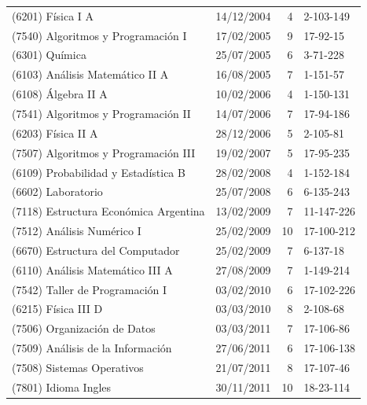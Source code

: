 \documentclass[a4paper,11pt]{article}
\begin{document}
\begin{longtable}{|l|l|r|l|}
  (6201) Física I A                                 & 14/12/2004 & 4  & 2-103-149         \\
  (7540) Algoritmos y Programación I                & 17/02/2005 & 9  & 17-92-15          \\
  (6301) Química                                    & 25/07/2005 & 6  & 3-71-228          \\
  (6103) Análisis Matemático II A                   & 16/08/2005 & 7  & 1-151-57          \\
  (6108) Álgebra II A                               & 10/02/2006 & 4  & 1-150-131         \\
  (7541) Algoritmos y Programación II               & 14/07/2006 & 7  & 17-94-186         \\
  (6203) Física II A                                & 28/12/2006 & 5  & 2-105-81          \\
  (7507) Algoritmos y Programación III              & 19/02/2007 & 5  & 17-95-235         \\
  (6109) Probabilidad y Estadística B               & 28/02/2008 & 4  & 1-152-184         \\
  (6602) Laboratorio                                & 25/07/2008 & 6  & 6-135-243         \\
  (7118) Estructura Económica Argentina             & 13/02/2009 & 7  & 11-147-226        \\
  (7512) Análisis Numérico I                        & 25/02/2009 & 10 & 17-100-212        \\
  (6670) Estructura del Computador                  & 25/02/2009 & 7  & 6-137-18          \\
  (6110) Análisis Matemático III A                  & 27/08/2009 & 7  & 1-149-214         \\
  (7542) Taller de Programación I                   & 03/02/2010 & 6  & 17-102-226        \\
  (6215) Física III D                               & 03/03/2010 & 8  & 2-108-68          \\
  (7506) Organización de Datos                      & 03/03/2011 & 7  & 17-106-86         \\
  (7509) Análisis de la Información                 & 27/06/2011 & 6  & 17-106-138        \\
  (7508) Sistemas Operativos                        & 21/07/2011 & 8  & 17-107-46         \\
  (7801) Idioma Ingles                              & 30/11/2011 & 10 & 18-23-114         \\

\end{longtable}
\end{document}
